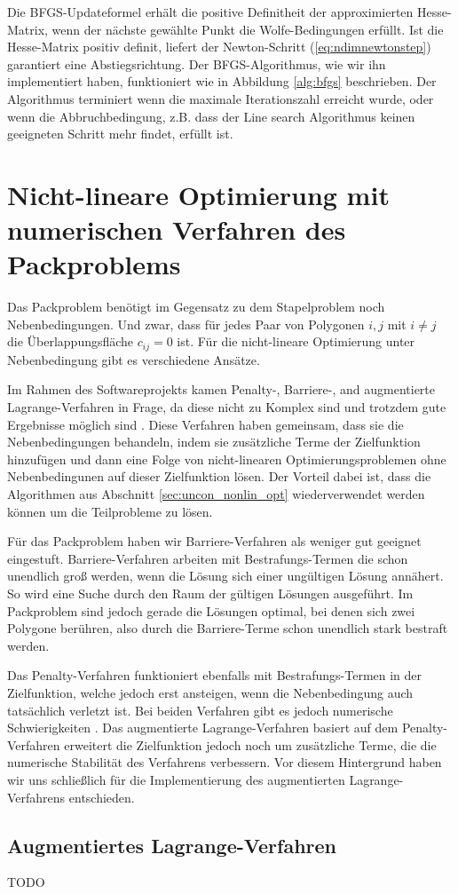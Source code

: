 \documentclass[runningheads,a4paper]{llncs}
\begin{document}
Die BFGS-Updateformel erhält die positive Definitheit der approximierten Hesse-Matrix, wenn der nächste gewählte Punkt die Wolfe-Bedingungen erfüllt. Ist die Hesse-Matrix positiv definit, liefert der Newton-Schritt (\ref{eq:ndimnewtonstep}) garantiert eine Abstiegsrichtung. Der BFGS-Algorithmus, wie wir ihn implementiert haben, funktioniert wie in Abbildung \ref{alg:bfgs} beschrieben.
Der Algorithmus terminiert wenn die maximale Iterationszahl erreicht wurde, oder wenn die Abbruchbedingung, z.B. dass der Line search Algorithmus keinen geeigneten Schritt mehr findet, erfüllt ist.

\section{Nicht-lineare Optimierung mit numerischen Verfahren des Packproblems}
\label{sec:cons_nonlin_opt}
Das Packproblem benötigt im Gegensatz zu dem Stapelproblem noch Nebenbedingungen. Und zwar, dass für jedes Paar von Polygonen $i,j$ mit $i \neq j$ die Überlappungsfläche $c_{ij}=0$ ist. Für die nicht-lineare Optimierung unter Nebenbedingung gibt es verschiedene Ansätze.

Im Rahmen des Softwareprojekts kamen Penalty-, Barriere-, and augmentierte Lagrange-Verfahren in Frage, da diese nicht zu Komplex sind und trotzdem gute Ergebnisse möglich sind \cite{nocedal1999numerical}. Diese Verfahren haben gemeinsam, dass sie die Nebenbedingungen behandeln, indem sie zusätzliche Terme der Zielfunktion hinzufügen und dann eine Folge von nicht-linearen Optimierungsproblemen ohne Nebenbedingunen auf dieser Zielfunktion lösen. Der Vorteil dabei ist, dass die Algorithmen aus Abschnitt \ref{sec:uncon_nonlin_opt} wiederverwendet werden können um die Teilprobleme zu lösen.

Für das Packproblem haben wir Barriere-Verfahren als weniger gut geeignet eingestuft. Barriere-Verfahren arbeiten mit Bestrafungs-Termen die schon unendlich groß werden, wenn die Lösung sich einer ungültigen Lösung annähert. So wird eine Suche durch den Raum der gültigen Lösungen ausgeführt. Im Packproblem sind jedoch gerade die Lösungen optimal, bei denen sich zwei Polygone berühren, also durch die Barriere-Terme schon unendlich stark bestraft werden.

Das Penalty-Verfahren funktioniert ebenfalls mit Bestrafungs-Termen in der Zielfunktion, welche jedoch erst ansteigen, wenn die Nebenbedingung auch tatsächlich verletzt ist. Bei beiden Verfahren gibt es jedoch numerische Schwierigkeiten \cite{nocedal1999numerical}. Das augmentierte Lagrange-Verfahren basiert auf dem Penalty-Verfahren erweitert die Zielfunktion jedoch noch um zusätzliche Terme, die die numerische Stabilität des Verfahrens verbessern. Vor diesem Hintergrund haben wir uns schließlich für die Implementierung des augmentierten Lagrange-Verfahrens entschieden.

\subsection{Augmentiertes Lagrange-Verfahren}
TODO

{}

\end{document}
